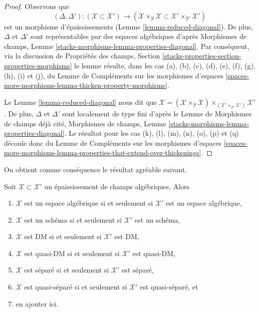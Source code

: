 \begin{proof}
Observons que
$$
(\Delta, \Delta') :
(\mathcal{X} \subset \mathcal{X}')
\longrightarrow
(\mathcal{X} \times_\mathcal{Y} \mathcal{X} \subset
\mathcal{X}' \times_{\mathcal{Y}'} \mathcal{X}')
$$
est un morphisme d'épaississements (Lemme \ref{lemma-reduced-diagonal}).
De plus, $\Delta$ et $\Delta'$ sont
représentables par des espaces algébriques d'après
Morphismes de champs, Lemme \ref{stacks-morphisms-lemma-properties-diagonal}.
Par conséquent, via la discussion de
Propriétés des champs, Section
\ref{stacks-properties-section-properties-morphisms}
le lemme résulte, dans les cas (a), (b), (c), (d),
(e), (f), (g), (h), (i) et (j), du
Lemme de Compléments sur les morphismes d'espaces
\ref{spaces-more-morphisms-lemma-thicken-property-morphisms}.

\medskip\noindent
Le Lemme \ref{lemma-reduced-diagonal} nous dit que
$\mathcal{X} = (\mathcal{X} \times_\mathcal{Y} \mathcal{X})
\times_{(\mathcal{X}' \times_{\mathcal{Y}'} \mathcal{X}')} \mathcal{X}'$.
De plus, $\Delta$ et $\Delta'$ sont localement de type fini d'après
le Lemme de Morphismes de champs déjà cité,
Morphismes de champs, Lemme \ref{stacks-morphisms-lemma-properties-diagonal}.
Le résultat pour les cas (k), (l), (m), (n), (o), (p) et (q) découle donc du
Lemme de Compléments sur les morphismes d'espaces
\ref{spaces-more-morphisms-lemma-properties-that-extend-over-thickenings}.
\end{proof}

\noindent
On obtient comme conséquence le résultat agréable suivant.

\begin{lemma}
\label{lemma-thickening-properties}
\begin{reference}
\cite[Théorème 2.2.5]{Conrad-moduli}
\end{reference}
Soit $\mathcal{X} \subset \mathcal{X}'$ un épaississement de
champs algébriques. Alors
\begin{enumerate}
\item $\mathcal{X}$ est un espace algébrique si et seulement si $\mathcal{X}'$
est un espace algébrique,
\item $\mathcal{X}$ est un schéma si et seulement si $\mathcal{X}'$ est un schéma,
\item $\mathcal{X}$ est DM si et seulement si $\mathcal{X}'$ est DM,
\item $\mathcal{X}$ est quasi-DM si et seulement si $\mathcal{X}'$ est quasi-DM,
\item $\mathcal{X}$ est séparé si et seulement si $\mathcal{X}'$ est séparé,
\item $\mathcal{X}$ est quasi-séparé si et seulement si $\mathcal{X}'$ est
quasi-séparé, et
\item en ajouter ici.
\end{enumerate}
\end{lemma}

